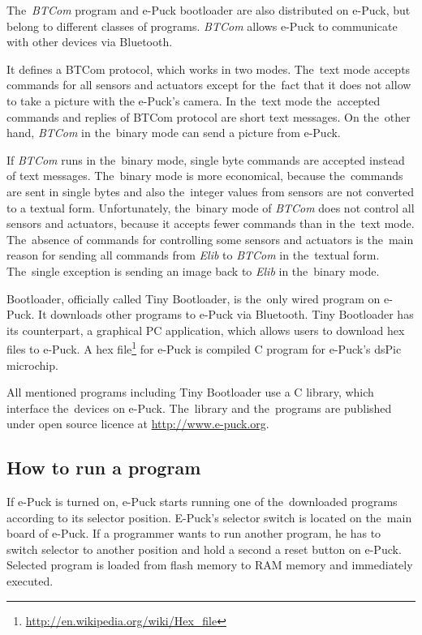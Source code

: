   The~{\it BTCom} program and e-Puck bootloader are also distributed on e-Puck, but belong to different classes of programs. 
  {\it BTCom} allows e-Puck to communicate with other devices via Bluetooth.
  
  It defines a BTCom protocol, which works in two modes. The~text mode accepts commands for
  all sensors and actuators except for the~fact that it does not allow to take a picture 
  with the e-Puck's camera. 
  In the~text mode the~accepted commands and replies of BTCom protocol are short text messages.
  On the~other hand, {\it BTCom} in the~binary mode can send a picture from e-Puck.
  
  If {\it BTCom} runs in the~binary mode, single byte commands are accepted instead of text messages.
  The~binary mode is more economical, 
  because the~commands are sent in single bytes and also the~integer values from sensors
  are not converted to a textual form.
  Unfortunately, the~binary mode of {\it BTCom} does not control all sensors and actuators, because it accepts fewer commands than in the~text mode.
  The~absence of commands for controlling some sensors and actuators is the~main reason 
  for sending all commands from {\it Elib} to {\it BTCom} in the~textual form. 
  The~single exception is sending an image back to {\it Elib} in the~binary mode.
   
  Bootloader, officially called Tiny Bootloader\cite{tiny},
  is the~only wired program on e-Puck. It downloads	other programs to e-Puck via Bluetooth. 
  Tiny Bootloader has its counterpart, a graphical PC application,
  which allows users to download hex files to e-Puck.
  A hex file\footnote{\small{\url{http://en.wikipedia.org/wiki/Hex_file}}} 
  for e-Puck is compiled C program for e-Puck's dsPic microchip. 
   
  All mentioned programs including Tiny Bootloader use a C library, which interface the~devices on e-Puck. 
  The~library and the~programs are published under open source licence at
  \url{http://www.e-puck.org}.

  \subsection*{How to run a program} %
  If e-Puck is turned on, e-Puck starts running one of the~downloaded programs according to its selector 
  position. E-Puck's selector switch is located on the~main board of e-Puck.
  If a programmer wants to run another program, he has to switch selector to another position
  and hold a second a reset button on e-Puck.	Selected program is loaded from flash memory
  to RAM memory and immediately executed.	
   
